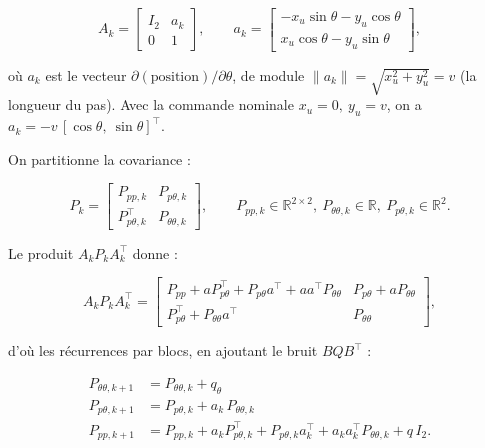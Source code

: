 \documentclass[11pt]{article}
\theoremstyle{remark}
\theoremstyle{definition}
\begin{document}
\begin{equation}
A_k =
\begin{bmatrix}
I_2 & a_k \\[2pt]
0 & 1
\end{bmatrix},
\qquad
a_k =
\begin{bmatrix}
-x_u\sin\theta - y_u\cos\theta \\[2pt]
x_u\cos\theta - y_u\sin\theta
\end{bmatrix},
\end{equation}

où $a_k$ est le vecteur $\partial(\text{position})/\partial\theta$, de module
$\|a_k\| = \sqrt{x_u^2 + y_u^2} = v$ (la longueur du pas). Avec la commande nominale
$x_u = 0,\ y_u = v$, on a $a_k = -v\,[\cos\theta,\ \sin\theta]^\top$.

On partitionne la covariance :

\begin{equation}
P_k =
\begin{bmatrix}
P_{pp,k} & P_{p\theta,k} \\[2pt]
P_{p\theta,k}^\top & P_{\theta\theta,k}
\end{bmatrix},
\qquad
P_{pp,k}\in\mathbb{R}^{2\times 2},\
P_{\theta\theta,k}\in\mathbb{R},\
P_{p\theta,k}\in\mathbb{R}^{2}.
\end{equation}

Le produit $A_k P_k A_k^\top$ donne :

\begin{equation}
A_k P_k A_k^\top =
\begin{bmatrix}
P_{pp} + a P_{p\theta}^\top + P_{p\theta} a^\top + a a^\top P_{\theta\theta} & P_{p\theta} + a P_{\theta\theta} \\[2pt]
P_{p\theta}^\top + P_{\theta\theta} a^\top & P_{\theta\theta}
\end{bmatrix},
\end{equation}

d'où les récurrences par blocs, en ajoutant le bruit $BQB^\top$ :

\begin{equation}
\boxed{\begin{aligned}
P_{\theta\theta,k+1} &= P_{\theta\theta,k} + q_\theta \\[2pt]
P_{p\theta,k+1} &= P_{p\theta,k} + a_k\,P_{\theta\theta,k} \\[2pt]
P_{pp,k+1} &= P_{pp,k} + a_k P_{p\theta,k}^\top + P_{p\theta,k} a_k^\top + a_k a_k^\top P_{\theta\theta,k} + q\,I_2 .
\end{aligned}}
\end{equation}
\end{document}
